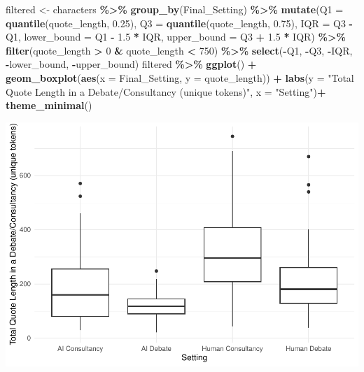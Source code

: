 \documentclass[
]{article}
\newenvironment{Shaded}{\begin{snugshade}}{\end{snugshade}}
\newcommand{\AttributeTok}[1]{\textcolor[rgb]{0.13,0.29,0.53}{#1}}
\newcommand{\DecValTok}[1]{\textcolor[rgb]{0.00,0.00,0.81}{#1}}
\newcommand{\FloatTok}[1]{\textcolor[rgb]{0.00,0.00,0.81}{#1}}
\newcommand{\FunctionTok}[1]{\textcolor[rgb]{0.13,0.29,0.53}{\textbf{#1}}}
\newcommand{\NormalTok}[1]{#1}
\newcommand{\OtherTok}[1]{\textcolor[rgb]{0.56,0.35,0.01}{#1}}
\newcommand{\SpecialCharTok}[1]{\textcolor[rgb]{0.81,0.36,0.00}{\textbf{#1}}}
\newcommand{\StringTok}[1]{\textcolor[rgb]{0.31,0.60,0.02}{#1}}
\begin{document}
\begin{Shaded}
\begin{Highlighting}[]
\NormalTok{filtered }\OtherTok{\textless{}{-}}\NormalTok{ characters }\SpecialCharTok{\%\textgreater{}\%}
  \FunctionTok{group\_by}\NormalTok{(Final\_Setting) }\SpecialCharTok{\%\textgreater{}\%}
  \FunctionTok{mutate}\NormalTok{(}\AttributeTok{Q1 =} \FunctionTok{quantile}\NormalTok{(quote\_length, }\FloatTok{0.25}\NormalTok{),}
         \AttributeTok{Q3 =} \FunctionTok{quantile}\NormalTok{(quote\_length, }\FloatTok{0.75}\NormalTok{),}
         \AttributeTok{IQR =}\NormalTok{ Q3 }\SpecialCharTok{{-}}\NormalTok{ Q1,}
         \AttributeTok{lower\_bound =}\NormalTok{ Q1 }\SpecialCharTok{{-}} \FloatTok{1.5} \SpecialCharTok{*}\NormalTok{ IQR,}
         \AttributeTok{upper\_bound =}\NormalTok{ Q3 }\SpecialCharTok{+} \FloatTok{1.5} \SpecialCharTok{*}\NormalTok{ IQR) }\SpecialCharTok{\%\textgreater{}\%}
  \FunctionTok{filter}\NormalTok{(quote\_length }\SpecialCharTok{\textgreater{}} \DecValTok{0} \SpecialCharTok{\&}\NormalTok{ quote\_length }\SpecialCharTok{\textless{}} \DecValTok{750}\NormalTok{) }\SpecialCharTok{\%\textgreater{}\%}
  \FunctionTok{select}\NormalTok{(}\SpecialCharTok{{-}}\NormalTok{Q1, }\SpecialCharTok{{-}}\NormalTok{Q3, }\SpecialCharTok{{-}}\NormalTok{IQR, }\SpecialCharTok{{-}}\NormalTok{lower\_bound, }\SpecialCharTok{{-}}\NormalTok{upper\_bound) }
\NormalTok{filtered }\SpecialCharTok{\%\textgreater{}\%}
  \FunctionTok{ggplot}\NormalTok{() }\SpecialCharTok{+}
  \FunctionTok{geom\_boxplot}\NormalTok{(}\FunctionTok{aes}\NormalTok{(}\AttributeTok{x =}\NormalTok{ Final\_Setting, }\AttributeTok{y =}\NormalTok{ quote\_length)) }\SpecialCharTok{+}
  \FunctionTok{labs}\NormalTok{(}\AttributeTok{y =} \StringTok{"Total Quote Length in a Debate/Consultancy (unique tokens)"}\NormalTok{, }\AttributeTok{x =} \StringTok{"Setting"}\NormalTok{)}\SpecialCharTok{+}
  \FunctionTok{theme\_minimal}\NormalTok{()}
\end{Highlighting}
\end{Shaded}

\includegraphics[width=1\linewidth]{debate-2309_files/figure-latex/quote_length graph-3}
\end{document}
